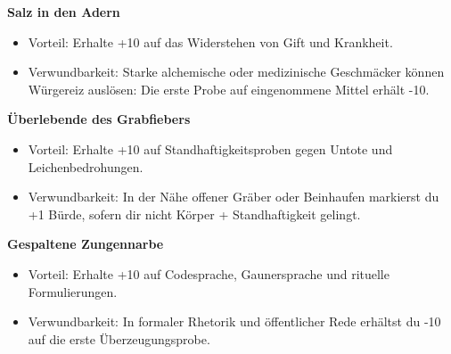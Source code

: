 \noindent\textbf{Salz in den Adern}\par
\begin{itemize}[leftmargin=*,nosep]
\item Vorteil: Erhalte +10 auf das Widerstehen von Gift und Krankheit.
\item Verwundbarkeit: Starke alchemische oder medizinische Geschmäcker können Würgereiz auslösen: Die erste Probe auf eingenommene Mittel erhält -10.
\end{itemize}
\noindent\textbf{Überlebende des Grabfiebers}\par
\begin{itemize}[leftmargin=*,nosep]
\item Vorteil: Erhalte +10 auf Standhaftigkeitsproben gegen Untote und Leichenbedrohungen.
\item Verwundbarkeit: In der Nähe offener Gräber oder Beinhaufen markierst du +1 Bürde, sofern dir nicht Körper + Standhaftigkeit gelingt.
\end{itemize}
\noindent\textbf{Gespaltene Zungennarbe}\par
\begin{itemize}[leftmargin=*,nosep]
\item Vorteil: Erhalte +10 auf Codesprache, Gaunersprache und rituelle Formulierungen.
\item Verwundbarkeit: In formaler Rhetorik und öffentlicher Rede erhältst du -10 auf die erste Überzeugungsprobe.
\end{itemize}
